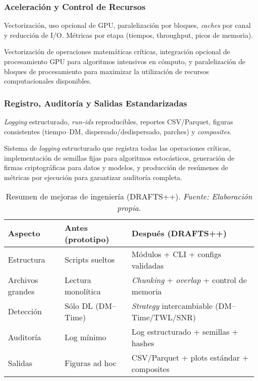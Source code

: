 \subsubsection{Aceleración y Control de Recursos}

Vectorización, uso opcional de GPU, paralelización por bloques, \textit{caches} por canal y reducción de I/O. Métricas por etapa (tiempos, throughput, picos de memoria).

Vectorización de operaciones matemáticas críticas, integración opcional de procesamiento GPU para algoritmos intensivos en cómputo, y paralelización de bloques de procesamiento para maximizar la utilización de recursos computacionales disponibles.

\subsubsection{Registro, Auditoría y Salidas Estandarizadas}

\textit{Logging} estructurado, \textit{run-ids} reproducibles, reportes CSV/Parquet, figuras consistentes (tiempo--DM, dispersado/dedispersado, parches) y \textit{composites}.

Sistema de \emph{logging} estructurado que registra todas las operaciones críticas, implementación de semillas fijas para algoritmos estocásticos, generación de firmas criptográficas para datos y modelos, y producción de resúmenes de métricas por ejecución para garantizar auditoría completa.

\begin{table}[h] 
\centering 
  \caption{\label{tab:mejoras} Resumen de mejoras de ingeniería (DRAFTS++). \textit{Fuente: Elaboración propia}.}
\begin{tabular}{p{} p{} p{}} 
\toprule 
    \textbf{Aspecto} & \textbf{Antes (prototipo)} & \textbf{Después (DRAFTS++)} \\
\midrule 
Estructura & Scripts sueltos & Módulos + CLI + configs validadas \\ 
    Archivos grandes & Lectura monolítica & \emph{Chunking} + \emph{overlap} + control de memoria \\
    Detección & Sólo DL (DM--Time) & \emph{Strategy} intercambiable (DM--Time/TWL/SNR) \\
Auditoría & Log mínimo & Log estructurado + semillas + hashes \\ 
    Salidas & Figuras ad hoc & CSV/Parquet + plots estándar + composites \\
\bottomrule 
\end{tabular} 
\end{table}

